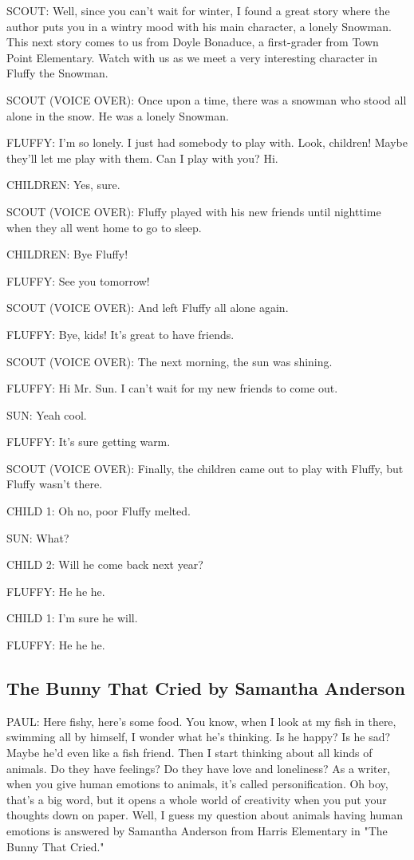 SCOUT:
Well, since you can't wait for winter, I found a great story where the author puts you in a wintry mood with his main character, a lonely Snowman.
This next story comes to us from Doyle Bonaduce, a first-grader from Town Point Elementary.
Watch with us as we meet a very interesting character in Fluffy the Snowman.

SCOUT (VOICE OVER):
Once upon a time, there was a snowman who stood all alone in the snow.
He was a lonely Snowman.

FLUFFY:
I'm so lonely.
I just had somebody to play with.
Look, children!
Maybe they'll let me play with them.
Can I play with you? Hi.

CHILDREN:
Yes, sure.

SCOUT (VOICE OVER):
Fluffy played with his new friends until nighttime when they all went home to go to sleep.

CHILDREN:
Bye Fluffy!

FLUFFY:
See you tomorrow!

SCOUT (VOICE OVER):
And left Fluffy all alone again.

FLUFFY:
Bye, kids!
It's great to have friends.

SCOUT (VOICE OVER):
The next morning, the sun was shining.

FLUFFY:
Hi Mr. Sun.
I can't wait for my new friends to come out.

SUN:
Yeah cool.

FLUFFY:
It's sure getting warm.

SCOUT (VOICE OVER):
Finally, the children came out to play with Fluffy, but Fluffy wasn't there.

CHILD 1:
Oh no, poor Fluffy melted.

SUN:
What?

CHILD 2:
Will he come back next year?

FLUFFY:
He he he.

CHILD 1:
I'm sure he will.

FLUFFY:
He he he.

\subsection{The Bunny That Cried by Samantha Anderson}

PAUL:
Here fishy, here's some food.
You know, when I look at my fish in there, swimming all by himself, I wonder what he's thinking.
Is he happy?
Is he sad?
Maybe he'd even like a fish friend.
Then I start thinking about all kinds of animals.
Do they have feelings?
Do they have love and loneliness?
As a writer, when you give human emotions to animals, it's called personification.
Oh boy, that's a big word, but it opens a whole world of creativity when you put your thoughts down on paper.
Well, I guess my question about animals having human emotions is answered by Samantha Anderson from Harris Elementary in "The Bunny That Cried."

